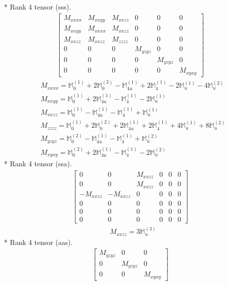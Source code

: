 \documentclass[fleqn,8pt,landscape]{jsarticle}
\begin{document}
* Rank 4 tensor (sss).
\begin{align*}
\begin{bmatrix} M_{xxxx} & M_{xxyy} & M_{xxzz} & 0 & 0 & 0 \\ M_{xxyy} & M_{xxxx} & M_{xxzz} & 0 & 0 & 0 \\ M_{xxzz} & M_{xxzz} & M_{zzzz} & 0 & 0 & 0 \\ 0 & 0 & 0 & M_{yzyz} & 0 & 0 \\ 0 & 0 & 0 & 0 & M_{yzyz} & 0 \\ 0 & 0 & 0 & 0 & 0 & M_{xyxy} \end{bmatrix}
\end{align*}
\begin{align*}
& M_{xxxx} = \mathbb{M}_{0}^{(1)} + 2 \mathbb{M}_{0}^{(2)} - \mathbb{M}_{4u}^{(1)} + 2 \mathbb{M}_{4}^{(1)} - 2 \mathbb{M}_{u}^{(1)} - 4 \mathbb{M}_{u}^{(2)} \\
& M_{xxyy} = \mathbb{M}_{0}^{(1)} + 2 \mathbb{M}_{4u}^{(1)} - \mathbb{M}_{4}^{(1)} - 2 \mathbb{M}_{u}^{(1)} \\
& M_{xxzz} = \mathbb{M}_{0}^{(1)} - \mathbb{M}_{4u}^{(1)} - \mathbb{M}_{4}^{(1)} + \mathbb{M}_{u}^{(1)} \\
& M_{zzzz} = \mathbb{M}_{0}^{(1)} + 2 \mathbb{M}_{0}^{(2)} + 2 \mathbb{M}_{4u}^{(1)} + 2 \mathbb{M}_{4}^{(1)} + 4 \mathbb{M}_{u}^{(1)} + 8 \mathbb{M}_{u}^{(2)} \\
& M_{yzyz} = \mathbb{M}_{0}^{(2)} - \mathbb{M}_{4u}^{(1)} - \mathbb{M}_{4}^{(1)} + \mathbb{M}_{u}^{(2)} \\
& M_{xyxy} = \mathbb{M}_{0}^{(2)} + 2 \mathbb{M}_{4u}^{(1)} - \mathbb{M}_{4}^{(1)} - 2 \mathbb{M}_{u}^{(2)}
\end{align*}
* Rank 4 tensor (ssa).
\begin{align*}
\begin{bmatrix} 0 & 0 & M_{xxzz} & 0 & 0 & 0 \\ 0 & 0 & M_{xxzz} & 0 & 0 & 0 \\ - M_{xxzz} & - M_{xxzz} & 0 & 0 & 0 & 0 \\ 0 & 0 & 0 & 0 & 0 & 0 \\ 0 & 0 & 0 & 0 & 0 & 0 \\ 0 & 0 & 0 & 0 & 0 & 0 \end{bmatrix}
\end{align*}
\begin{align*}
& M_{xxzz} = 3 \mathbb{M}_{u}^{(3)}
\end{align*}
* Rank 4 tensor (aas).
\begin{align*}
\begin{bmatrix} M_{yzyz} & 0 & 0 \\ 0 & M_{yzyz} & 0 \\ 0 & 0 & M_{xyxy} \end{bmatrix}
\end{align*}
\end{document}
